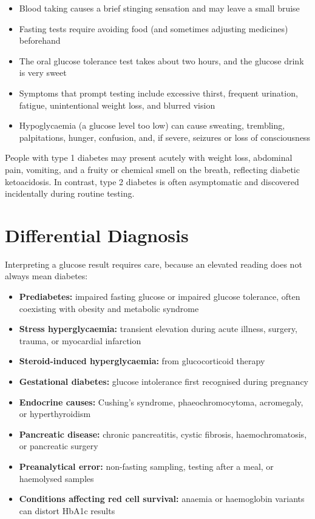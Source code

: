 \begin{itemize}
    \item Blood taking causes a brief stinging sensation and may leave a small bruise
    \item Fasting tests require avoiding food (and sometimes adjusting medicines) beforehand
    \item The oral glucose tolerance test takes about two hours, and the glucose drink is very sweet
    \item Symptoms that prompt testing include excessive thirst, frequent urination, fatigue, unintentional weight loss, and blurred vision
    \item Hypoglycaemia (a glucose level too low) can cause sweating, trembling, palpitations, hunger, confusion, and, if severe, seizures or loss of consciousness
\end{itemize}

People with type 1 diabetes may present acutely with weight loss, abdominal pain, vomiting, and a fruity or chemical smell on the breath, reflecting diabetic ketoacidosis. In contrast, type 2 diabetes is often asymptomatic and discovered incidentally during routine testing.

\section*{Differential Diagnosis}
Interpreting a glucose result requires care, because an elevated reading does not always mean diabetes:

\begin{itemize}
    \item \textbf{Prediabetes:} impaired fasting glucose or impaired glucose tolerance, often coexisting with obesity and metabolic syndrome
    \item \textbf{Stress hyperglycaemia:} transient elevation during acute illness, surgery, trauma, or myocardial infarction
    \item \textbf{Steroid-induced hyperglycaemia:} from glucocorticoid therapy
    \item \textbf{Gestational diabetes:} glucose intolerance first recognised during pregnancy
    \item \textbf{Endocrine causes:} Cushing's syndrome, phaeochromocytoma, acromegaly, or hyperthyroidism
    \item \textbf{Pancreatic disease:} chronic pancreatitis, cystic fibrosis, haemochromatosis, or pancreatic surgery
    \item \textbf{Preanalytical error:} non-fasting sampling, testing after a meal, or haemolysed samples
    \item \textbf{Conditions affecting red cell survival:} anaemia or haemoglobin variants can distort HbA1c results
\end{itemize}

